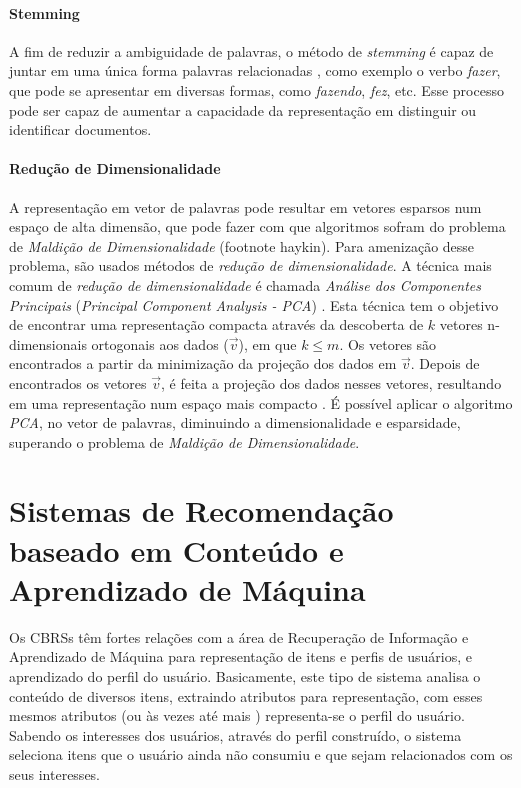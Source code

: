 \documentclass[normaltoc, espacoumemeio, pnumromarab,ruledheader]{abnt}
\begin{document}

    \subsubsection{Stemming}

    A fim de reduzir a ambiguidade de palavras, o método de \textit{stemming} é capaz de juntar em uma única forma palavras relacionadas \cite{Miner2012}, como exemplo o verbo \textit{fazer}, que pode se apresentar em diversas formas, como \textit{fazendo}, \textit{fez}, etc. Esse processo pode ser capaz de aumentar a capacidade da representação em distinguir ou identificar documentos.

    \subsubsection{Redução de Dimensionalidade}

    A representação em vetor de palavras pode resultar em vetores esparsos num espaço de alta dimensão, que pode fazer com que algoritmos sofram do problema de \textit{Maldição de Dimensionalidade} (footnote haykin).
    Para amenização desse problema, são usados métodos de \textit{redução de dimensionalidade}.
    A técnica mais comum de \textit{redução de dimensionalidade} é chamada \textit{Análise dos Componentes Principais} (\textit{Principal Component Analysis - PCA}) \cite{Murphy2012}.
    Esta técnica tem o objetivo de encontrar uma representação compacta através da descoberta de $k$ vetores n-dimensionais ortogonais aos dados ($\vec{v}$), em que $k \leq m$. Os vetores são encontrados a partir da minimização da projeção dos dados em $\vec{v}$.
    Depois de encontrados os vetores $\vec{v}$, é feita a projeção dos dados nesses vetores, resultando em uma representação num espaço mais compacto \cite{Kamber2011}.
    É possível aplicar o algoritmo \textit{PCA}, no vetor de palavras, diminuindo a dimensionalidade e esparsidade, superando o problema de \textit{Maldição de Dimensionalidade}.


\chapter{Sistemas de Recomendação baseado em Conteúdo e Aprendizado de Máquina}

Os CBRSs têm fortes relações com a área de Recuperação de Informação \cite{Adomavicius2005,Jannach2011} e Aprendizado de Máquina \cite{Adomavicius2005,Lops2011} para representação de itens e perfis de usuários, e aprendizado do perfil do usuário. Basicamente, este tipo de sistema analisa o conteúdo de diversos itens, extraindo atributos para representação, com esses mesmos atributos (ou às vezes até mais \cite{Capelle2012}) representa-se o perfil do usuário. Sabendo os interesses dos usuários, através do perfil construído, o sistema seleciona itens que o usuário ainda não consumiu e que sejam relacionados com os seus interesses.
\end{document}
